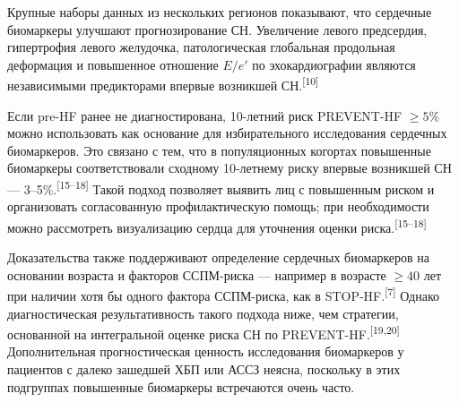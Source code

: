 \documentclass[11pt,a4paper]{article}
\newcommand{\src}[1]{\textsuperscript{[#1]}}
\begin{document}
Крупные наборы данных из нескольких регионов показывают, что сердечные биомаркеры улучшают прогнозирование СН. Увеличение левого предсердия, гипертрофия левого желудочка, патологическая глобальная продольная деформация и повышенное отношение $E/e'$ по эхокардиографии являются независимыми предикторами впервые возникшей СН.\src{10}

Если pre-HF ранее не диагностирована, 10-летний риск PREVENT-HF $\geq5\%$ можно использовать как основание для избирательного исследования сердечных биомаркеров. Это связано с тем, что в популяционных когортах повышенные биомаркеры соответствовали сходному 10-летнему риску впервые возникшей СН --- 3--5\%.\src{15--18} Такой подход позволяет выявить лиц с повышенным риском и организовать согласованную профилактическую помощь; при необходимости можно рассмотреть визуализацию сердца для уточнения оценки риска.\src{15--18}

Доказательства также поддерживают определение сердечных биомаркеров на основании возраста и факторов ССПМ-риска --- например в возрасте $\geq40$ лет при наличии хотя бы одного фактора ССПМ-риска, как в STOP-HF.\src{7} Однако диагностическая результативность такого подхода ниже, чем стратегии, основанной на интегральной оценке риска СН по PREVENT-HF.\src{19,20} Дополнительная прогностическая ценность исследования биомаркеров у пациентов с далеко зашедшей ХБП или АССЗ неясна, поскольку в этих подгруппах повышенные биомаркеры встречаются очень часто.
\end{document}
